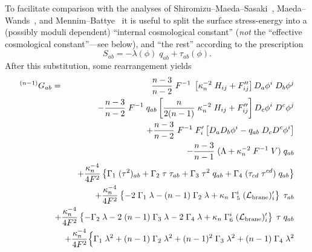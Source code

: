 \documentclass[a4paper,10pt]{article}
\begin{document}
{To facilitate comparison with the analyses of
Shiromizu--Maeda--Sasaki~\cite{Shiromizu}, Maeda--Wands~\cite{Wands},
and Mennim--Battye~\cite{Mennim} it is useful to split the surface
stress-energy into a (possibly moduli dependent) ``internal
cosmological constant'' ({\emph{not}} the ``effective cosmological
constant''---see below), and ``the rest'' according to the
prescription
%
\begin{equation}
S_{ab} = -\lambda(\phi) \; q_{ab} + \tau_{ab}(\phi).
\end{equation}
%
After this substitution, some rearrangement yields 
%
\begin{eqnarray}
{}^{(n-1)}G_{ab}=&&\hspace{-6mm}
{n-3 \over n-2} \;F^{-1} \; 
\left[\kappa_n^{-2}\;H_{ij}+F''_{ij}\right] D_a \phi^i \; D_b \phi^j 
\nonumber \\
&&\hspace{-6mm}
- 
{n-3 \over n-2} \; F^{-1} \; q_{ab}
\left[{n\over 2(n-1) }\; \kappa_n^{-2}\;H_{ij}+ F''_{ij}\right] 
D_c \phi^i \; D^c \phi^j 
\nonumber \\
&&\hspace{-6mm}
+{n-3 \over n-2} \; F^{-1} \;F'_i
\left[  D_a D_b \phi^i - q_{ab} \; 
D_c D^c \phi^i \right]  
\nonumber \\
&&\hspace{-6mm}
-{n-3 \over n-1} \;(\Lambda + \kappa_n^{-2}\;F^{-1} \; V) \; q_{ab} 
\nonumber \\
&&\hspace{-6mm}
+ {\kappa_n^{-4}\over4F^2} \left\{
\Gamma_1 \; (\tau^2)_{ab} 
+\Gamma_2 \; \tau \; \tau_{ab} 
+\Gamma_3 \; \tau^2 \; q_{ab} 
+\Gamma_4 \; (\tau_{cd}\;\tau^{cd}) \; q_{ab}
\right\}
\nonumber \\
&&\hspace{-6mm}
+ {\kappa_n^{-4}\over4F^2} \left\{
-2\; \Gamma_1 \; \lambda 
-(n-1) \;\Gamma_2 \; \lambda
+\kappa_n \; \Gamma_5^i  \; (\L_\brane)'_i  
\right\} \; \tau_{ab}
\nonumber \\
&&\hspace{-6mm}
+ {\kappa_n^{-4}\over4F^2} \left\{
-\Gamma_2  \; \lambda 
-2\;(n-1)\;\Gamma_3 \; \lambda
-2\;\Gamma_4 \; \lambda 
+\kappa_n \; \Gamma_6^i  \; (\L_\brane)'_i  
\right\} \; \tau \; q_{ab}
\nonumber \\
&&\hspace{-6mm}
+ {\kappa_n^{-4}\over4F^2} 
\Big\{
\Gamma_1  \; \lambda^2 
+ (n-1) \; \Gamma_2 \; \lambda^2
+ (n-1)^2 \;\Gamma_3 \; \lambda^2
+ (n-1) \;  \Gamma_4 \; \lambda^2 
\nonumber\\

\end{eqnarray}}
\end{document}
